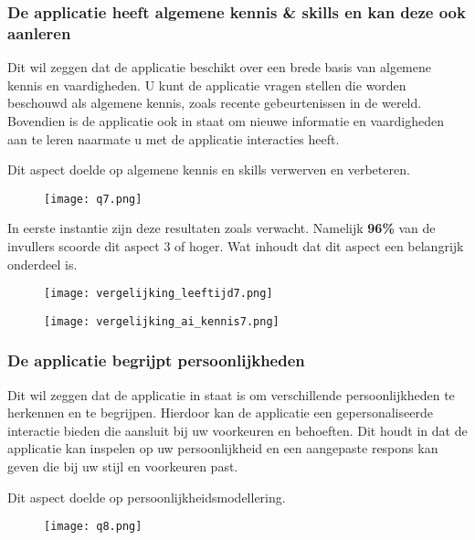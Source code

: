 \subsubsection{De applicatie heeft algemene kennis \& skills en kan deze ook aanleren}

Dit wil zeggen dat de applicatie beschikt over een brede basis van algemene kennis en vaardigheden. U kunt de applicatie vragen stellen die worden beschouwd als algemene kennis, zoals recente gebeurtenissen in de wereld. Bovendien is de applicatie ook in staat om nieuwe informatie en vaardigheden aan te leren naarmate u met de applicatie interacties heeft.

Dit aspect doelde op algemene kennis en skills verwerven en verbeteren.

\begin{figure}[htbp]
    \centering
    \texttt{[image: q7.png]}
    \label{fig:vraag_7_resultaat}
\end{figure}

In eerste instantie zijn deze resultaten zoals verwacht. Namelijk \textbf{96\%} van de invullers scoorde dit aspect 3 of hoger. Wat inhoudt dat dit aspect een belangrijk onderdeel is.

\begin{figure}[htbp]
    \centering
    \texttt{[image: vergelijking\_leeftijd7.png]}
    \label{fig:vergelijking_leeftijd7}
\end{figure}

\begin{figure}[htbp]
    \centering
    \texttt{[image: vergelijking\_ai\_kennis7.png]}
    \label{fig:vergelijking_ai_kennis7}
\end{figure}

\subsubsection{De applicatie begrijpt persoonlijkheden}

Dit wil zeggen dat de applicatie in staat is om verschillende persoonlijkheden te herkennen en te begrijpen. Hierdoor kan de applicatie een gepersonaliseerde interactie bieden die aansluit bij uw voorkeuren en behoeften. Dit houdt in dat de applicatie kan inspelen op uw persoonlijkheid en een aangepaste respons kan geven die bij uw stijl en voorkeuren past.

Dit aspect doelde op persoonlijkheidsmodellering.

\begin{figure}[htbp]
    \centering
    \texttt{[image: q8.png]}
    \label{fig:vraag_8_resultaat}
\end{figure}

